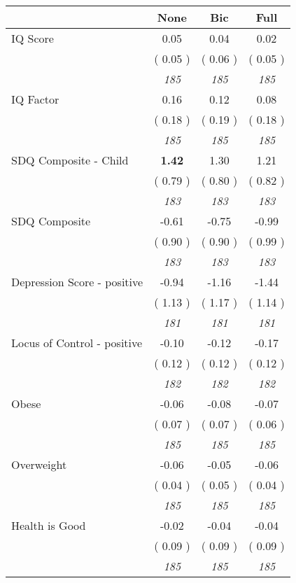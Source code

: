 \begin{tabular}{l c c c}
\toprule
 & None & Bic & Full \\
\midrule
IQ Score &      0.05 &      0.04 &      0.02 \\
& (     0.05 ) & (     0.06 ) & (     0.05 ) \\
& \textit{ 185 } & \textit{ 185 } & \textit{ 185 } \\
IQ Factor &      0.16 &      0.12 &      0.08 \\
& (     0.18 ) & (     0.19 ) & (     0.18 ) \\
& \textit{ 185 } & \textit{ 185 } & \textit{ 185 } \\
SDQ Composite - Child & \textbf{      1.42 } &      1.30 &      1.21 \\
& (     0.79 ) & (     0.80 ) & (     0.82 ) \\
& \textit{ 183 } & \textit{ 183 } & \textit{ 183 } \\
SDQ Composite &     -0.61 &     -0.75 &     -0.99 \\
& (     0.90 ) & (     0.90 ) & (     0.99 ) \\
& \textit{ 183 } & \textit{ 183 } & \textit{ 183 } \\
Depression Score - positive &     -0.94 &     -1.16 &     -1.44 \\
& (     1.13 ) & (     1.17 ) & (     1.14 ) \\
& \textit{ 181 } & \textit{ 181 } & \textit{ 181 } \\
Locus of Control - positive &     -0.10 &     -0.12 &     -0.17 \\
& (     0.12 ) & (     0.12 ) & (     0.12 ) \\
& \textit{ 182 } & \textit{ 182 } & \textit{ 182 } \\
Obese &     -0.06 &     -0.08 &     -0.07 \\
& (     0.07 ) & (     0.07 ) & (     0.06 ) \\
& \textit{ 185 } & \textit{ 185 } & \textit{ 185 } \\
Overweight &     -0.06 &     -0.05 &     -0.06 \\
& (     0.04 ) & (     0.05 ) & (     0.04 ) \\
& \textit{ 185 } & \textit{ 185 } & \textit{ 185 } \\
Health is Good &     -0.02 &     -0.04 &     -0.04 \\
& (     0.09 ) & (     0.09 ) & (     0.09 ) \\
& \textit{ 185 } & \textit{ 185 } & \textit{ 185 } \\

\end{tabular}
